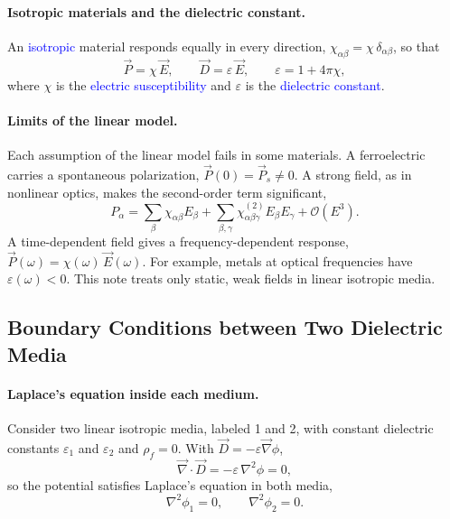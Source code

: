 \paragraph{Isotropic materials and the dielectric constant.}
An \textcolor{blue}{isotropic} material responds equally in every direction, $\chi_{\alpha\beta} = \chi\,\delta_{\alpha\beta}$, so that
\begin{equation}
    \boxed{
    \vec P = \chi\,\vec E, \qquad \vec D = \varepsilon\,\vec E, \qquad \varepsilon = 1 + 4\pi\chi,
    }
\end{equation}
where $\chi$ is the \textcolor{blue}{electric susceptibility} and $\varepsilon$ is the \textcolor{blue}{dielectric constant}.

\paragraph{Limits of the linear model.}
Each assumption of the linear model fails in some materials. A ferroelectric carries a spontaneous polarization, $\vec P(0) = \vec P_s \neq 0$. A strong field, as in nonlinear optics, makes the second-order term significant,
\begin{equation*}
    P_\alpha = \sum_\beta \chi_{\alpha\beta}E_\beta + \sum_{\beta,\gamma}\chi^{(2)}_{\alpha\beta\gamma}E_\beta E_\gamma + \mathcal{O}(E^3).
\end{equation*}
A time-dependent field gives a frequency-dependent response, $\vec P(\omega) = \chi(\omega)\,\vec E(\omega)$. For example, metals at optical frequencies have $\varepsilon(\omega) < 0$. This note treats only static, weak fields in linear isotropic media.

\subsection{Boundary Conditions between Two Dielectric Media}

\paragraph{Laplace's equation inside each medium.}
Consider two linear isotropic media, labeled 1 and 2, with constant dielectric constants $\varepsilon_1$ and $\varepsilon_2$ and $\rho_f = 0$. With $\vec D = -\varepsilon\vec\nabla\phi$,
\begin{equation*}
    \vec\nabla\cdot\vec D = -\varepsilon\,\nabla^2\phi = 0,
\end{equation*}
so the potential satisfies Laplace's equation in both media,
\begin{equation}
    \boxed{
    \nabla^2\phi_1 = 0, \qquad \nabla^2\phi_2 = 0.
    }
\end{equation}

